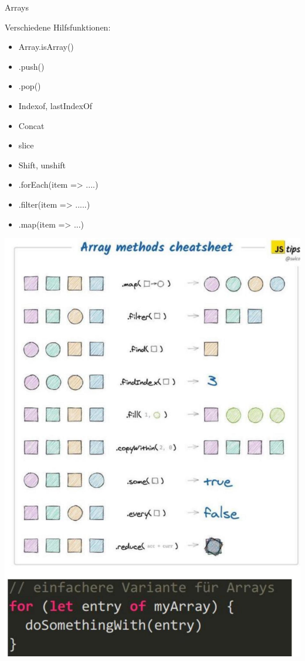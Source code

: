 \begin{code}{Arrays}

    Verschiedene Hilfsfunktionen:

    \begin{itemize}
        \item Array.isArray()
        \item .push()
        \item .pop()
        \item Indexof, lastIndexOf
        \item Concat
        \item slice
        \item Shift, unshift
        \item .forEach(item => ....)
        \item .filter(item => .....)
        \item .map(item => ...)
    \end{itemize}

    \includegraphics[width=\linewidth]{images/2024_12_29_858f09cde51177c71657g-08}
\end{code}

